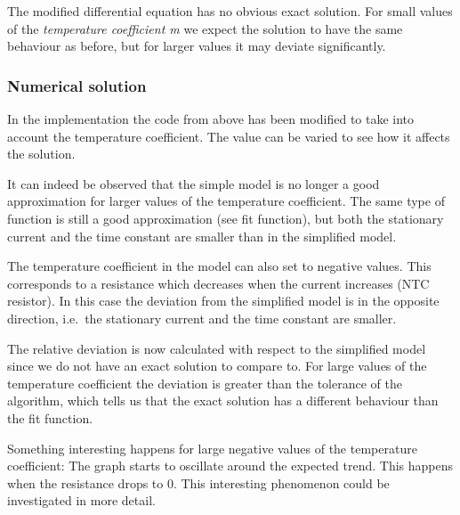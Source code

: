 \documentclass[11pt]{article}
\begin{document}
The modified differential equation has no obvious exact solution. For
small values of the \emph{temperature coefficient m} we expect the
solution to have the same behaviour as before, but for larger values it
may deviate significantly.

\hypertarget{numerical-solution}{%
\subsubsection{Numerical solution}\label{numerical-solution2}}

In the implementation the code from above has been modified to take into
account the temperature coefficient. The value can be varied to see how
it affects the solution.

It can indeed be observed that the simple model is no longer a good
approximation for larger values of the temperature coefficient. The same
type of function is still a good approximation (see fit function), but
both the stationary current and the time constant are smaller than in
the simplified model.

The temperature coefficient in the model can also set to negative
values. This corresponds to a resistance which decreases when the
current increases (NTC resistor). In this case the deviation from the
simplified model is in the opposite direction, i.e.~the stationary
current and the time constant are smaller.

The relative deviation is now calculated with respect to the simplified
model since we do not have an exact solution to compare to. For large
values of the temperature coefficient the deviation is greater than the
tolerance of the algorithm, which tells us that the exact solution has a
different behaviour than the fit function.

Something interesting happens for large negative values of the
temperature coefficient: The graph starts to oscillate around the
expected trend. This happens when the resistance drops to 0. This
interesting phenomenon could be investigated in more detail.
\end{document}
